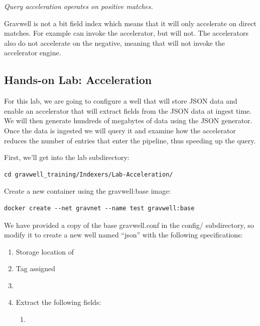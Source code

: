 {\textit{Query acceleration operates on positive matches.}

Gravwell is not a bit field index which means that it will only accelerate on direct matches.  For example  can invoke the accelerator, but  will not.  The accelerators also do not accelerate on the negative, meaning that  will not invoke the accelerator engine.

\clearpage
\subsection{Hands-on Lab: Acceleration}

For this lab, we are going to configure a well that will store JSON
data and enable an accelerator that will extract fields from the JSON
data at ingest time. We will then generate hundreds of megabytes of data
using the JSON generator. Once the data is ingested we will query
it and examine how the accelerator reduces the number of entries that
enter the pipeline, thus speeding up the query.

First, we'll get into the lab subdirectory:

\begin{Verbatim}[breaklines=true]
cd gravwell_training/Indexers/Lab-Acceleration/
\end{Verbatim}

Create a new container using the gravwell:base image:

\begin{Verbatim}[breaklines=true]
docker create --net gravnet --name test gravwell:base
\end{Verbatim}

We have provided a copy of the base gravwell.conf in the config/ subdirectory, 
so modify it to create a new well named ``json'' with the
following specifications:

\begin{enumerate}
	\item Storage location of 
	\item Tag  assigned
	\item {}
	\item Extract the following fields:
	\begin{enumerate}
		\item {}
	\end{enumerate}
\end{enumerate}

}
